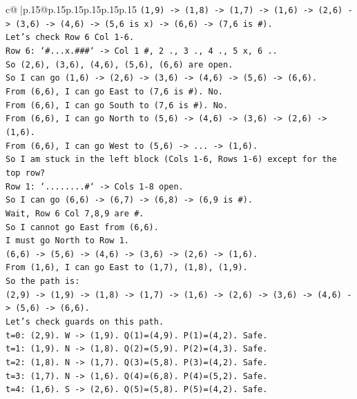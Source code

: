 \documentclass{article}
\begin{document}
{\begin{supertabular}{c@{$\;$}|p{.15\linewidth}@{}p{.15\linewidth}p{.15\linewidth}p{.15\linewidth}p{.15\linewidth}p{.15\linewidth}}
{{{\texttt{(1,9) {-}> (1,8) {-}> (1,7) {-}> (1,6) {-}> (2,6) {-}> (3,6) {-}> (4,6) {-}> (5,6 is x) {-}> (6,6) {-}> (7,6 is \#).} \\
\texttt{Let's check Row 6 Col 1{-}6.} \\
\texttt{Row 6: `\#...x.\#\#\#` {-}> Col 1 \#, 2 ., 3 ., 4 ., 5 x, 6 ..} \\
\texttt{So (2,6), (3,6), (4,6), (5,6), (6,6) are open.} \\
\texttt{So I can go (1,6) {-}> (2,6) {-}> (3,6) {-}> (4,6) {-}> (5,6) {-}> (6,6).} \\
\texttt{From (6,6), I can go East to (7,6 is \#). No.} \\
\texttt{From (6,6), I can go South to (7,6 is \#). No.} \\
\texttt{From (6,6), I can go North to (5,6) {-}> (4,6) {-}> (3,6) {-}> (2,6) {-}> (1,6).} \\
\texttt{From (6,6), I can go West to (5,6) {-}> ... {-}> (1,6).} \\
\texttt{So I am stuck in the left block (Cols 1{-}6, Rows 1{-}6) except for the top row?} \\
\texttt{Row 1: `........\#` {-}> Cols 1{-}8 open.} \\
\texttt{So I can go (6,6) {-}> (6,7) {-}> (6,8) {-}> (6,9 is \#).} \\
\texttt{Wait, Row 6 Col 7,8,9 are \#.} \\
\texttt{So I cannot go East from (6,6).} \\
\texttt{I must go North to Row 1.} \\
\texttt{(6,6) {-}> (5,6) {-}> (4,6) {-}> (3,6) {-}> (2,6) {-}> (1,6).} \\
\texttt{From (1,6), I can go East to (1,7), (1,8), (1,9).} \\
\texttt{So the path is:} \\
\texttt{(2,9) {-}> (1,9) {-}> (1,8) {-}> (1,7) {-}> (1,6) {-}> (2,6) {-}> (3,6) {-}> (4,6) {-}> (5,6) {-}> (6,6).} \\
\texttt{Let's check guards on this path.} \\
\texttt{t=0: (2,9). W {-}> (1,9). Q(1)=(4,9). P(1)=(4,2). Safe.} \\
\texttt{t=1: (1,9). N {-}> (1,8). Q(2)=(5,9). P(2)=(4,3). Safe.} \\
\texttt{t=2: (1,8). N {-}> (1,7). Q(3)=(5,8). P(3)=(4,2). Safe.} \\
\texttt{t=3: (1,7). N {-}> (1,6). Q(4)=(6,8). P(4)=(5,2). Safe.} \\
\texttt{t=4: (1,6). S {-}> (2,6). Q(5)=(5,8). P(5)=(4,2). Safe.} \\
}}}
\end{supertabular}}
\end{document}
